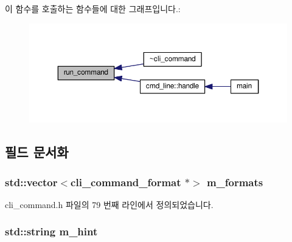 이 함수를 호출하는 함수들에 대한 그래프입니다.\+:
\nopagebreak
\begin{figure}[H]
\begin{center}
\leavevmode
\includegraphics[width=350pt]{classcli__command_a8bd8ac0f5b50e8083f020aa0a88fba85_icgraph}
\end{center}
\end{figure}




\subsection{필드 문서화}
\subsubsection[{\texorpdfstring{m\+\_\+formats}{m_formats}}]{\setlength{\rightskip}{0pt plus 5cm}std\+::vector$<${\bf cli\+\_\+command\+\_\+format} $\ast$$>$ m\+\_\+formats\hspace{0.3cm}{\ttfamily [private]}}\hypertarget{classcli__command_a08886759ebf01d26ba123d7cdaa4df16}{}\label{classcli__command_a08886759ebf01d26ba123d7cdaa4df16}


cli\+\_\+command.\+h 파일의 79 번째 라인에서 정의되었습니다.

\subsubsection[{\texorpdfstring{m\+\_\+hint}{m_hint}}]{\setlength{\rightskip}{0pt plus 5cm}std\+::string m\+\_\+hint\hspace{0.3cm}{\ttfamily [private]}}\hypertarget{classcli__command_a3feeeba99be6bb94b8fa0ebc88ef09cf}{}\label{classcli__command_a3feeeba99be6bb94b8fa0ebc88ef09cf}


